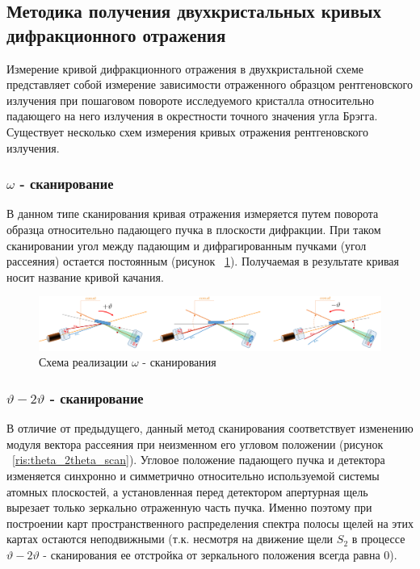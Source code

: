 \subsection{Методика получения двухкристальных кривых дифракционного отражения}

Измерение кривой дифракционного отражения в двухкристальной схеме представляет
собой измерение зависимости отраженного образцом рентгеновского излучения при
пошаговом повороте исследуемого кристалла относительно падающего на него
излучения в окрестности точного значения угла Брэгга.
Существует несколько схем измерения кривых отражения рентгеновского излучения.

\subsubsection{$\omega$ - сканирование}
В данном типе сканирования кривая отражения измеряется путем поворота образца
относительно падающего пучка в плоскости дифракции. При таком сканировании
угол между падающим и дифрагированным пучками (угол рассеяния) остается постоянным
(рисунок ~\ref{ris:omega_scan}). Получаемая в результате кривая носит название кривой качания.

\begin{figure}[H]
  \centering
  \includegraphics[width=1\textwidth]{images/omega_scan.png}
  \caption{Схема реализации $\omega $ - сканирования}
  \label{ris:omega_scan}
\end{figure}

\subsubsection{$\vartheta - 2\vartheta$ - сканирование}
В отличие от предыдущего, данный метод сканирования соответствует изменению
 модуля вектора рассеяния при неизменном его угловом положении
 (рисунок ~\ref{ris:theta_2theta_scan}). Угловое положение падающего пучка и
 детектора изменяется синхронно и симметрично относительно используемой системы
 атомных плоскостей, а установленная перед детектором апертурная щель вырезает
  только зеркально отраженную часть пучка. Именно поэтому при построении карт
   пространственного распределения спектра полосы щелей на этих картах остаются
   неподвижными (т.к. несмотря на движение щели  $S_2$ в процессе
    $\vartheta - 2\vartheta$ -  сканирования ее отстройка от зеркального
    положения всегда равна 0).


